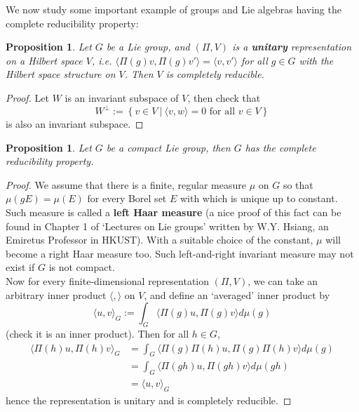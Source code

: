 \documentclass[11pt]{book}
\newtheorem{proposition}[theorem]{Proposition}
\begin{document}
We now study some important example of groups and Lie algebras having the complete reducibility property:
\begin{proposition}
Let $G$ be a Lie group, and $(\Pi,V)$ is a \textbf{unitary} representation on a Hilbert space $V$, i.e. $\langle \Pi(g)v, \Pi(g)v'\rangle = \langle v, v' \rangle$ for all $g \in G$ with the Hilbert space structure on $V$. Then $V$ is completely reducible.
\end{proposition}
\begin{proof}
Let $W$ is an invariant subspace of $V$, then check that
$$W^{\perp} := \left\{v \in V\ \Big|\ \langle v, w \rangle = 0 \text{ for all }v \in V \right\}$$
is also an invariant subspace.
\end{proof}

\begin{proposition} \label{sscompred}
Let $G$ be a compact Lie group, then $G$ has the complete reducibility property.
\end{proposition}
\begin{proof}
We assume that there is a finite, regular measure $\mu$ on $G$ so that $\mu(gE) = \mu(E)$ for every Borel set $E$ with which is unique up to constant. Such measure is called a \textbf{left Haar measure} (a nice proof of this fact can be found in Chapter 1 of `Lectures on Lie groups' written by W.Y. Hsiang, an Emiretus Professor in HKUST). With a suitable choice of the constant, $\mu$ will become a right Haar measure too. Such left-and-right invariant measure may not exist if $G$ is not compact.\\
Now for every finite-dimensional representation $(\Pi,V)$, we can take an arbitrary inner product $\langle, \rangle$ on $V$, and define an `averaged' inner product by
$$\langle u,v \rangle_G := \int_G \langle \Pi(g)u, \Pi(g)v \rangle d\mu(g)$$
(check it is an inner product). Then for all $h \in G$,
\begin{align*}
\langle \Pi(h)u,\Pi(h)v \rangle_G &= \int_G \langle \Pi(g)\Pi(h)u, \Pi(g)\Pi(h)v \rangle d\mu(g)\\
&= \int_G \langle \Pi(gh)u, \Pi(gh)v \rangle d\mu(gh)\\
&= \langle u,v \rangle_G
\end{align*}
hence the representation is unitary and is completely reducible.
\end{proof}


\newpage
\end{document}
